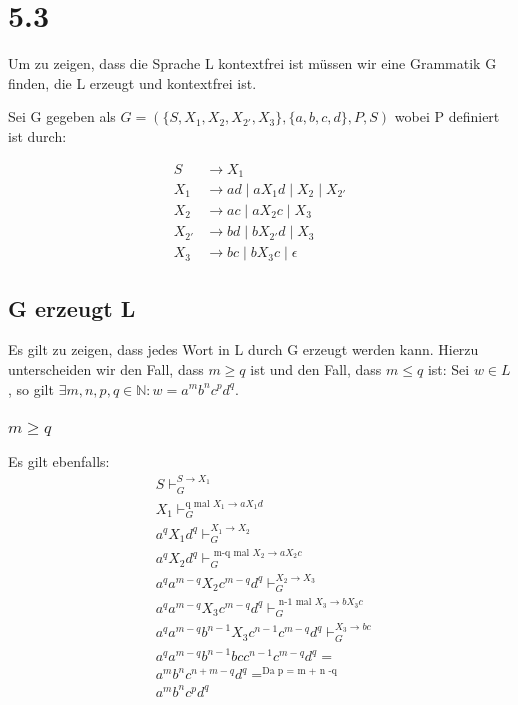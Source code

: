 \documentclass[12pt, a4paper]{article}
\begin{document}
\section*{5.3}
Um zu zeigen, dass die Sprache L kontextfrei ist müssen wir eine Grammatik G finden, die L erzeugt und kontextfrei ist.

Sei G gegeben als $G = (\{ S,  X_1, X_2, X_{2'}, X_3 \},\{a,b,c,d\}, P, S )$ wobei P definiert ist durch:

\begin{align*}
S &\rightarrow X_1 \\
X_1 &\rightarrow ad \mid a X_1d \mid X_2 \mid X_{2'} \\
X_2 &\rightarrow ac \mid a X_2 c \mid X_3 \\
X_{2'} &\rightarrow bd \mid b X_{2'} d \mid X_3 \\
X_3 &\rightarrow bc \mid b X_3 c \mid \epsilon
\end{align*}

\subsection*{G erzeugt L}
Es gilt zu zeigen, dass jedes Wort in L durch G erzeugt werden kann. Hierzu unterscheiden wir den Fall, dass $m \ge q$ ist und den Fall, dass $m \le q$ ist:
Sei $w \in L$, so gilt $\exists m,n,p,q \in \mathbb{N}: w = a^m b^n c^p d^q$.

\subsubsection*{$m \ge q$}
 Es gilt ebenfalls:
\begin{align*}
&S \vdash_G^{S \rightarrow X_1} \\
&X_1 \vdash_G^{\text{q mal } X_1 \rightarrow a X_1 d} \\
&a^q X_1 d^q \vdash_G^{X_1 \rightarrow X_2} \\
&a^q X_2 d^q \vdash_G^{\text{ m-q mal } X_2 \rightarrow a X_2 c}  \\
&a^q a^{m-q} X_2 c^{m-q} d^q \vdash_G^{X_2 \rightarrow X_3} \\
&a^q a^{m-q} X_3 c^{m-q} d^q \vdash_G^{\text{ n-1 mal } X_3 \rightarrow b X_3 c }\\
&a^q a^{m-q} b^{n-1} X_3 c^{n-1} c^{m-q} d^q \vdash_G^{X_3 \rightarrow bc} \\
&a^q a^{m-q} b^{n-1} bc c^{n-1} c^{m-q} d^q = \\
&a^m b^n c^{n + m - q} d^q =^{\text{Da p = m + n -q}} \\
&a^m b^n c^p d^q \\
\end{align*}
\end{document}
